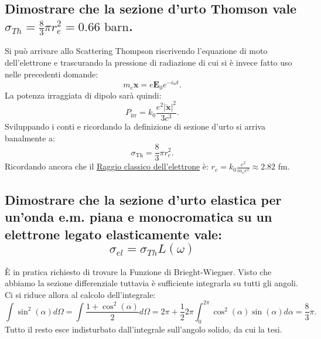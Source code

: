 \subsection[\hspace{2mm} Dimostrare il valore della sezione d'urto Thompson]{Dimostrare che la sezione d’urto Thomson vale $\sigma_{Th} = \frac{8}{3}\pi r_{e}^2  = 0.66 \text{ barn}$.}
Si può arrivare allo Scattering Thompson riscrivendo l'equazione di moto dell'elettrone e trascurando la pressione di radiazione di cui si è invece fatto uso nelle precedenti domande:
\[
m_e \ddot{\boldsymbol{x}}= e \boldsymbol{E}_0 e^{-i \omega t}
.\] 
La potenza irraggiata di dipolo sarà quindi:
\[
P_{\text{irr}} = k_0 \frac{e^2 \left| \ddot{\boldsymbol{x}} \right|^2}{3c^3} 
.\]
Sviluppando i conti e ricordando la definizione di sezione d'urto si arriva banalmente a:
\[
\sigma_{\text{Th}}=\frac{8}{3}\pi r_e^2
.\] 
Ricordando ancora che il \hyperref[eq: raggio classico]{Raggio classico dell'elettrone} è: $r_e = k_0 \frac{e^2}{m_e c^2} \approx 2.82$ fm.

\subsection[\hspace{2mm} Sezione d'urto elastica per onda elettromagnetica piana su elettrone legato elasticamente]{Dimostrare che la sezione d’urto elastica per un’onda e.m. piana e monocromatica su un elettrone legato elasticamente vale:
\[
	\sigma_{el} = \sigma_{Th} L\left( \omega \right) 
\] 
}
È in pratica richiesto di trovare la Funzione di Brieght-Wiegner. Visto che abbiamo la sezione differenziale tuttavia è sufficiente integrarla su tutti gli angoli. Ci si riduce allora al calcolo dell'integrale:
\[
	\int \sin^2\left( \alpha  \right) d \Omega = \int \frac{1 + \cos^2\left( \alpha \right) }{2} d\Omega = 2\pi + \frac{1}{2} 2 \pi \int_0^{2\pi} \cos^2\left( \alpha  \right) \sin\left( \alpha  \right) d \alpha = \frac{8}{3}\pi  
.\] 
Tutto il resto esce indisturbato dall'integrale sull'angolo solido, da cui la tesi.

